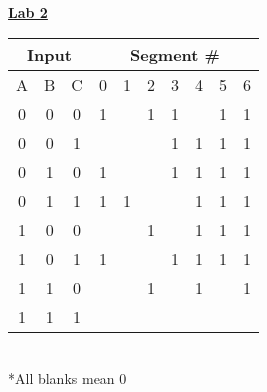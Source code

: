 \documentclass[12pt]{article}
\begin{document}
\setlength\extrarowheight{2pt}
\leavevmode\\[-9mm]
{\LARGE \noindent \underline{\textbf{Lab 2}}}
\begin{center}
  \begin{tabular}{|c|c|c| |c|c|c|c|c|c|c|}
    \hline
    \multicolumn{3}{|c||}{\textbf{Input}}& \multicolumn{7}{c|}{\textbf{Segment \#}}\\
		\hline
		A & B & C & 0 & 1 & 2 & 3 & 4 & 5 & 6 \\ \hline \hline
		0 & 0 & 0 & 1 &   & 1 & 1 &   & 1 & 1 \\ \hline
		0 & 0 & 1 &   &   &   & 1 & 1 & 1 & 1 \\ \hline
		0 & 1 & 0 & 1 &   &   & 1 & 1 & 1 & 1 \\ \hline
		0 & 1 & 1 & 1 & 1 &   &   & 1 & 1 & 1 \\ \hline
		1 & 0 & 0 &   &   & 1 &   & 1 & 1 & 1 \\ \hline
		1 & 0 & 1 & 1 &   &   & 1 & 1 & 1 & 1 \\ \hline
		1 & 1 & 0 &   &   & 1 &   & 1 &   & 1 \\ \hline
		1 & 1 & 1 &   &   &   &   &   &   &   \\ \hline
  \end{tabular} \leavevmode \\[2mm]
  *All blanks mean 0 \\[10mm]
\end{center}
\end{document}
